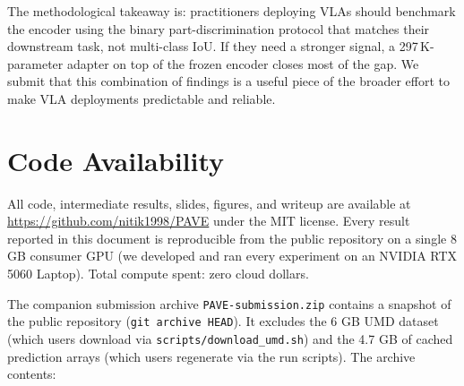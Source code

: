 \documentclass[11pt]{article}
\begin{document}
The methodological takeaway is: practitioners deploying VLAs should
benchmark the encoder using the binary part-discrimination protocol
that matches their downstream task, not multi-class IoU. If they need
a stronger signal, a 297\,K-parameter adapter on top of the frozen
encoder closes most of the gap. We submit that this combination of
findings is a useful piece of the broader effort to make VLA
deployments predictable and reliable.

\section{Code Availability}
\label{sec:code}

All code, intermediate results, slides, figures, and writeup are
available at \url{https://github.com/nitik1998/PAVE} under the MIT
license. Every result reported in this document is reproducible from
the public repository on a single 8 GB consumer GPU (we developed and
ran every experiment on an NVIDIA RTX 5060 Laptop). Total compute
spent: zero cloud dollars.

The companion submission archive \verb|PAVE-submission.zip| contains a
snapshot of the public repository (\texttt{git archive HEAD}). It
excludes the 6 GB UMD dataset (which users download via
\verb|scripts/download_umd.sh|) and the 4.7 GB of cached prediction
arrays (which users regenerate via the run scripts). The archive
contents:
\end{document}
